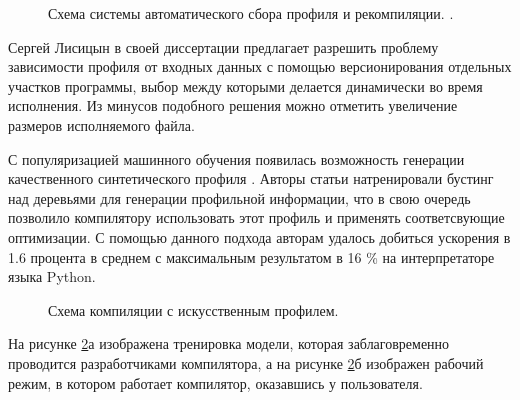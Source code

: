 \begin{figure}[ht]
	\caption{Схема системы автоматического сбора профиля и рекомпиляции. \cite{chen2016autofdo}.}\label{partReview:fdo2}
\end{figure}

Сергей Лисицын  в своей диссертации \cite{SergeyL1} предлагает разрешить проблему зависимости профиля от входных данных с помощью версионирования отдельных участков программы, выбор между которыми делается динамически во время исполнения. Из минусов подобного решения можно отметить увеличение размеров исполняемого файла.

С популяризацией машинного обучения появилась возможность генерации качественного синтетического профиля \cite{rotem2021profile}. Авторы статьи натренировали бустинг над деревьями для генерации профильной информации, что в свою очередь позволило компилятору использовать этот профиль и применять соответсвующие оптимизации. С помощью данного подхода авторам удалось добиться ускорения в 1.6 процента в среднем с максимальным результатом в 16 \%  на интерпретаторе языка Python. 
 \begin{figure}[htbp]
	\centering
	
	\caption{Схема компиляции с искусственным профилем.}
	\label{partReview:pgo_without profile}
\end{figure}
На рисунке \ref{partReview:pgo_without profile}а изображена тренировка модели, которая заблаговременно проводится разработчиками компилятора, а на рисунке \ref{partReview:pgo_without profile}б изображен рабочий режим, в котором работает компилятор, оказавшись у пользователя.

\FloatBarrier

